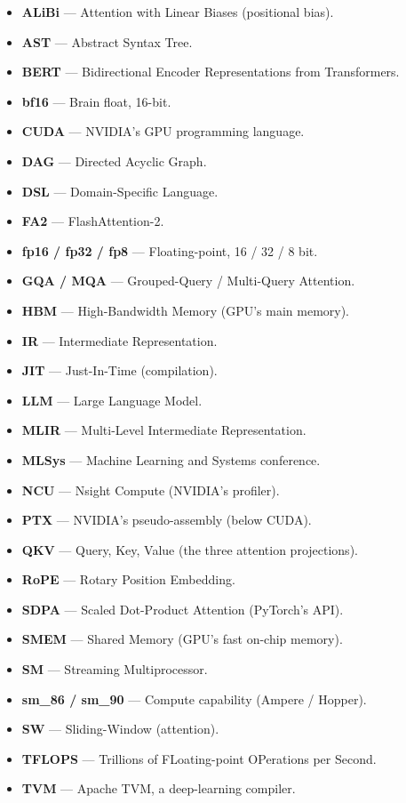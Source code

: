 \documentclass[11pt]{article}
\begin{document}
\begin{itemize}[leftmargin=1.4em,itemsep=1pt]
  \item \textbf{ALiBi} --- Attention with Linear Biases (positional bias).
  \item \textbf{AST} --- Abstract Syntax Tree.
  \item \textbf{BERT} --- Bidirectional Encoder Representations from Transformers.
  \item \textbf{bf16} --- Brain float, 16-bit.
  \item \textbf{CUDA} --- NVIDIA's GPU programming language.
  \item \textbf{DAG} --- Directed Acyclic Graph.
  \item \textbf{DSL} --- Domain-Specific Language.
  \item \textbf{FA2} --- FlashAttention-2.
  \item \textbf{fp16 / fp32 / fp8} --- Floating-point, 16 / 32 / 8 bit.
  \item \textbf{GQA / MQA} --- Grouped-Query / Multi-Query Attention.
  \item \textbf{HBM} --- High-Bandwidth Memory (GPU's main memory).
  \item \textbf{IR} --- Intermediate Representation.
  \item \textbf{JIT} --- Just-In-Time (compilation).
  \item \textbf{LLM} --- Large Language Model.
  \item \textbf{MLIR} --- Multi-Level Intermediate Representation.
  \item \textbf{MLSys} --- Machine Learning and Systems conference.
  \item \textbf{NCU} --- Nsight Compute (NVIDIA's profiler).
  \item \textbf{PTX} --- NVIDIA's pseudo-assembly (below CUDA).
  \item \textbf{QKV} --- Query, Key, Value (the three attention projections).
  \item \textbf{RoPE} --- Rotary Position Embedding.
  \item \textbf{SDPA} --- Scaled Dot-Product Attention (PyTorch's API).
  \item \textbf{SMEM} --- Shared Memory (GPU's fast on-chip memory).
  \item \textbf{SM} --- Streaming Multiprocessor.
  \item \textbf{sm\_86 / sm\_90} --- Compute capability (Ampere / Hopper).
  \item \textbf{SW} --- Sliding-Window (attention).
  \item \textbf{TFLOPS} --- Trillions of FLoating-point OPerations per Second.
  \item \textbf{TVM} --- Apache TVM, a deep-learning compiler.
\end{itemize}
\end{document}
